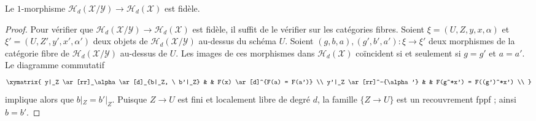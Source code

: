 \begin{lemma}
\label{lemma-faithful-hilbert}
Le $1$-morphisme
$\mathcal{H}_d(\mathcal{X}/\mathcal{Y}) \to \mathcal{H}_d(\mathcal{X})$
est fidèle.
\end{lemma}

\begin{proof}
Pour vérifier que
$\mathcal{H}_d(\mathcal{X}/\mathcal{Y}) \to \mathcal{H}_d(\mathcal{X})$
est fidèle, il suffit de le vérifier sur les catégories fibres.
Soient $\xi = (U, Z, y, x, \alpha)$ et $\xi' = (U, Z', y', x', \alpha')$
deux objets de $\mathcal{H}_d(\mathcal{X}/\mathcal{Y})$ au-dessus du
schéma $U$. Soient $(g, b, a), (g', b', a') : \xi \to \xi'$ deux morphismes
de la catégorie fibre de $\mathcal{H}_d(\mathcal{X}/\mathcal{Y})$ au-dessus de $U$.
Les images de ces morphismes dans $\mathcal{H}_d(\mathcal{X})$ coïncident
si et seulement si $g = g'$ et $a = a'$. Le diagramme commutatif
$$
\xymatrix{
y|_Z \ar[rr]_\alpha \ar[d]_{b|_Z, \ b'|_Z} & &
F(x) \ar[d]^{F(a) = F(a')} \\
y'|_Z \ar[rr]^-{\alpha'} & &
F(g^*x') = F((g')^*x') \\
}
$$
implique alors que $b|_Z = b'|_Z$. Puisque $Z \to U$ est fini et localement libre de degré
$d$, la famille $\{Z \to U\}$ est un recouvrement fppf ; ainsi $b = b'$.
\end{proof}


















